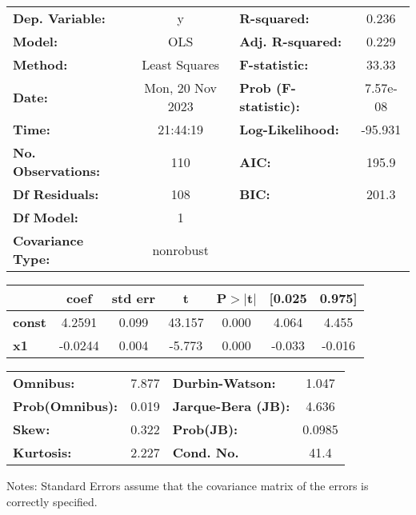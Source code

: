 \begin{center}
\begin{tabular}{lclc}
\toprule
\textbf{Dep. Variable:}    &        y         & \textbf{  R-squared:         } &     0.236   \\
\textbf{Model:}            &       OLS        & \textbf{  Adj. R-squared:    } &     0.229   \\
\textbf{Method:}           &  Least Squares   & \textbf{  F-statistic:       } &     33.33   \\
\textbf{Date:}             & Mon, 20 Nov 2023 & \textbf{  Prob (F-statistic):} &  7.57e-08   \\
\textbf{Time:}             &     21:44:19     & \textbf{  Log-Likelihood:    } &   -95.931   \\
\textbf{No. Observations:} &         110      & \textbf{  AIC:               } &     195.9   \\
\textbf{Df Residuals:}     &         108      & \textbf{  BIC:               } &     201.3   \\
\textbf{Df Model:}         &           1      & \textbf{                     } &             \\
\textbf{Covariance Type:}  &    nonrobust     & \textbf{                     } &             \\
\bottomrule
\end{tabular}
\begin{tabular}{lcccccc}
               & \textbf{coef} & \textbf{std err} & \textbf{t} & \textbf{P$> |$t$|$} & \textbf{[0.025} & \textbf{0.975]}  \\
\midrule
\textbf{const} &       4.2591  &        0.099     &    43.157  &         0.000        &        4.064    &        4.455     \\
\textbf{x1}    &      -0.0244  &        0.004     &    -5.773  &         0.000        &       -0.033    &       -0.016     \\
\bottomrule
\end{tabular}
\begin{tabular}{lclc}
\textbf{Omnibus:}       &  7.877 & \textbf{  Durbin-Watson:     } &    1.047  \\
\textbf{Prob(Omnibus):} &  0.019 & \textbf{  Jarque-Bera (JB):  } &    4.636  \\
\textbf{Skew:}          &  0.322 & \textbf{  Prob(JB):          } &   0.0985  \\
\textbf{Kurtosis:}      &  2.227 & \textbf{  Cond. No.          } &     41.4  \\
\bottomrule
\end{tabular}
\end{center}

Notes: \newline
 [1] Standard Errors assume that the covariance matrix of the errors is correctly specified.
